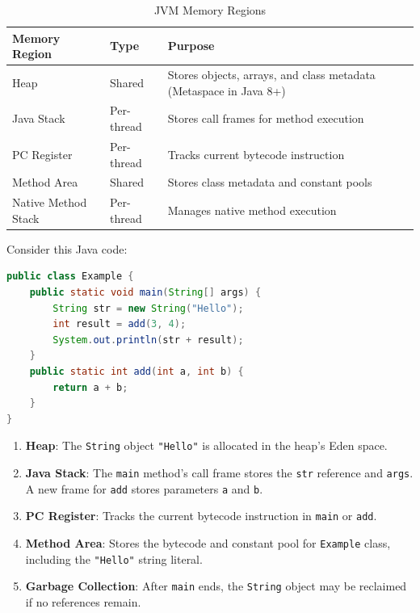 \documentclass{article}
\begin{document}
\begin{table}[h]
	\centering
	\begin{tabular}{|>{\raggedright\arraybackslash}m{3cm}|>{\raggedright\arraybackslash}m{4cm}|>{\raggedright\arraybackslash}m{5cm}|}
		\hline
		\textbf{Memory Region} & \textbf{Type} & \textbf{Purpose} \\
		\hline
		Heap & Shared & Stores objects, arrays, and class metadata (Metaspace in Java 8+) \\
		Java Stack & Per-thread & Stores call frames for method execution \\
		PC Register & Per-thread & Tracks current bytecode instruction \\
		Method Area & Shared & Stores class metadata and constant pools \\
		Native Method Stack & Per-thread & Manages native method execution \\
		\hline
	\end{tabular}
	\caption{JVM Memory Regions}
\end{table}

Consider this Java code:
\begin{lstlisting}[language=Java]
public class Example {
	public static void main(String[] args) {
		String str = new String("Hello");
		int result = add(3, 4);
		System.out.println(str + result);
	}
	public static int add(int a, int b) {
		return a + b;
	}
}
\end{lstlisting}

\begin{enumerate}
	\item \textbf{Heap}: The \texttt{String} object \texttt{"Hello"} is allocated in the heap's Eden space.
	\item \textbf{Java Stack}: The \texttt{main} method's call frame stores the \texttt{str} reference and \texttt{args}. A new frame for \texttt{add} stores parameters \texttt{a} and \texttt{b}.
	\item \textbf{PC Register}: Tracks the current bytecode instruction in \texttt{main} or \texttt{add}.
	\item \textbf{Method Area}: Stores the bytecode and constant pool for \texttt{Example} class, including the \texttt{"Hello"} string literal.
	\item \textbf{Garbage Collection}: After \texttt{main} ends, the \texttt{String} object may be reclaimed if no references remain.
\end{enumerate}
\end{document}
